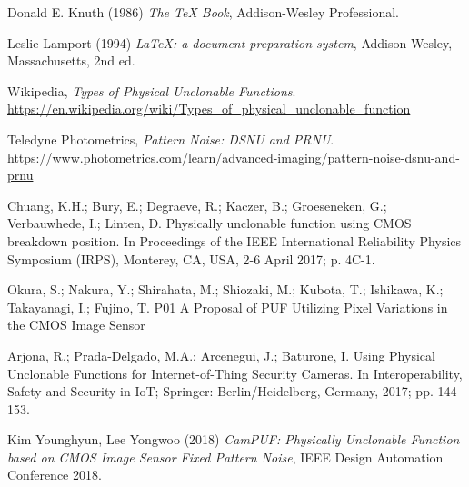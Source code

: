 \begin{thebibliography}{9}
Donald E. Knuth (1986) \emph{The \TeX{} Book}, Addison-Wesley Professional.

Leslie Lamport (1994) \emph{\LaTeX: a document preparation system}, Addison
Wesley, Massachusetts, 2nd ed.

Wikipedia, \emph{Types of Physical Unclonable Functions}. \url{https://en.wikipedia.org/wiki/Types_of_physical_unclonable_function}

Teledyne Photometrics, \emph{Pattern Noise: DSNU and PRNU}. \url{https://www.photometrics.com/learn/advanced-imaging/pattern-noise-dsnu-and-prnu}

Chuang, K.H.; Bury, E.; Degraeve, R.; Kaczer, B.; Groeseneken, G.; Verbauwhede, I.; Linten, D. Physically unclonable function
using CMOS breakdown position. In Proceedings of the IEEE International Reliability Physics Symposium (IRPS), Monterey, CA,
USA, 2-6 April 2017; p. 4C-1.

Okura, S.; Nakura, Y.; Shirahata, M.; Shiozaki, M.; Kubota, T.; Ishikawa, K.; Takayanagi, I.; Fujino, T. P01 A Proposal of PUF
Utilizing Pixel Variations in the CMOS Image Sensor

Arjona, R.; Prada-Delgado, M.A.; Arcenegui, J.; Baturone, I. Using Physical Unclonable Functions for Internet-of-Thing Security
Cameras. In Interoperability, Safety and Security in IoT; Springer: Berlin/Heidelberg, Germany, 2017; pp. 144-153.

Kim Younghyun, Lee Yongwoo (2018) \emph{CamPUF: Physically Unclonable Function based on CMOS Image Sensor Fixed Pattern Noise}, IEEE Design Automation Conference 2018.

\end{thebibliography}
